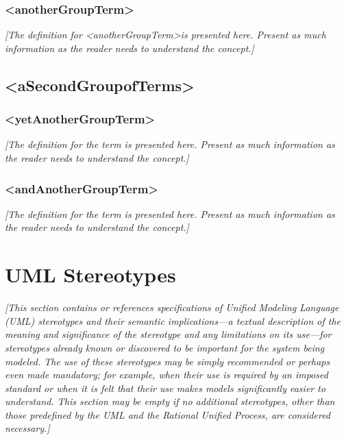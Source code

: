 \documentclass[12pt, a4paper, titlepage]{article}
\begin{document}
\subsubsection{\textless anotherGroupTerm\textgreater}  

\textit{{\color{blue}[The definition for \textless anotherGroupTerm\textgreater is presented here. Present as much information as the reader needs to understand the concept.]}}

\subsection{\textless aSecondGroupofTerms\textgreater}  

\subsubsection{\textless yetAnotherGroupTerm\textgreater}  

\textit{{\color{blue}[The definition for the term is presented here. Present as much information as the reader needs to understand the concept.]}}

\subsubsection{\textless andAnotherGroupTerm\textgreater}  

\textit{{\color{blue}[The definition for the term is presented here. Present as much information as the reader needs to understand the concept.]}}


\section{UML Stereotypes}

\textit{{\color{blue}[This section contains or references specifications of Unified Modeling Language (UML) stereotypes and their semantic implications—a textual description of the meaning and significance of the stereotype and any limitations on its use—for stereotypes already known or discovered to be important for the system being modeled. The use of these stereotypes may be simply recommended or perhaps even made mandatory; for example, when their use is required by an imposed standard or when it is felt that their use makes models significantly easier to understand. This section may be empty if no additional stereotypes, other than those predefined by the UML and the Rational Unified Process, are considered necessary.]}}
\end{document}
